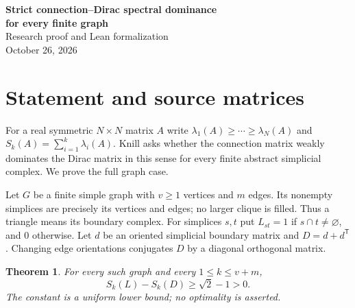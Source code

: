 \documentclass[11pt]{article}
\newtheorem{theorem}{Theorem}
\newcommand{\Sk}[2]{S_{#1}(#2)}
\begin{document}
\begin{center}
{\Large\bfseries Strict connection--Dirac spectral dominance\\for every finite graph}\\[.5em]
Research proof and Lean formalization\\
October 26, 2026
\end{center}
\begin{abstract}
Let $L$ be the simplex-intersection connection matrix of a nonempty finite
graph, viewed as its vertex-and-edge simplicial complex, and let $D$ be its
signed simplicial Dirac matrix. For every $1\le k\le v+m$ we prove
$\Sk{k}{L}-\Sk{k}{D}\ge\sqrt2-1>0$, where $S_k$ sums the $k$ largest
eigenvalues with multiplicity, $v$ is the number of vertices, and $m$ the
number of edges. Isolated vertices and disconnected graphs are allowed.
This establishes, with a uniform strict gap, the dimension-at-most-one case
of Knill's connection--Dirac conjecture. The higher-dimensional conjecture
remains outside the result. The proof uses incidence matrices, orthonormal
eigenvector lifts, the Ky Fan variational principle, and scalar inequalities.
\end{abstract}

\section{Statement and source matrices}
For a real symmetric $N\times N$ matrix $A$ write
$\lambda_1(A)\ge\cdots\ge\lambda_N(A)$ and
$\Sk{k}{A}=\sum_{i=1}^k\lambda_i(A)$.
Knill \cite[Conjecture~1, \S5.3]{K26} asks whether the connection matrix
weakly dominates the Dirac matrix in this sense for every finite abstract
simplicial complex. We prove the full graph case.

Let $G$ be a finite simple graph with $v\ge1$ vertices and $m$ edges.
Its nonempty simplices are precisely its vertices and edges; no larger
clique is filled. Thus a triangle means its boundary complex.
For simplices $s,t$ put $L_{st}=1$ if $s\cap t\ne\varnothing$, and $0$
otherwise. Let $d$ be an oriented simplicial boundary matrix and
$D=d+d^{\mathsf T}$.
Changing edge orientations conjugates $D$ by a diagonal orthogonal matrix.
\begin{theorem}\label{main}
For every such graph and every $1\le k\le v+m$,
\[
 \Sk{k}{L}-\Sk{k}{D}\ge\sqrt2-1>0.
\]
The constant is a uniform lower bound; no optimality is asserted.
\end{theorem}
\end{document}

